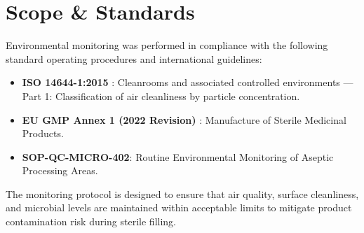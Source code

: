 \section{Scope \& Standards}
Environmental monitoring was performed in compliance with the following standard operating procedures and international guidelines:
\begin{itemize}
  \item \textbf{ISO 14644-1:2015} \cite{iso14644}: Cleanrooms and associated controlled environments --- Part 1: Classification of air cleanliness by particle concentration.
  \item \textbf{EU GMP Annex 1 (2022 Revision)} \cite{eugmpannex1}: Manufacture of Sterile Medicinal Products.
  \item \textbf{SOP-QC-MICRO-402}: Routine Environmental Monitoring of Aseptic Processing Areas.
\end{itemize}
The monitoring protocol is designed to ensure that air quality, surface cleanliness, and microbial levels are maintained within acceptable limits to mitigate product contamination risk during sterile filling.

